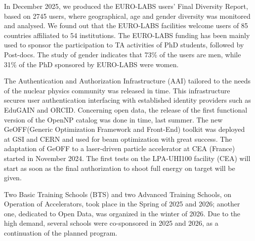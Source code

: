 In December 2025, we produced the EURO-LABS users' Final Diversity Report, based on 2745 users, where geographical, age and gender diversity was monitored and analysed. We found out that the EURO-LABS facilities welcome users of 85 countries affiliated to 54 institutions. The EURO-LABS funding has been mainly used to sponsor the participation to TA activities of PhD students, followed by Post-docs. The study of gender indicates that 73\% of the users are men, while 31\% of the PhD sponsored by EURO-LABS were women.

The Authentication and Authorization Infrastructure (AAI) tailored to the needs of the nuclear physics community was released in time.
This infrastructure secures user authentication interfacing with established identity providers such as EduGAIN and ORCID.
Concerning open data, the release of the first functional version of the OpenNP catalog was done in time, last summer.
The new GeOFF(Generic Optimization Framework
and Front-End) toolkit was deployed at GSI and CERN and used for beam optimization with great success. The adaptation of GeOFF to a laser-driven particle accelerator at CEA (France)  started in November 2024. The first tests on the LPA-UHI100 facility (CEA) will start as soon as the final authorization to shoot full energy on target will be given. 

Two Basic Training Schools (BTS) and two Advanced Training Schools, on Operation
of Accelerators, took place in the Spring of 2025 and 2026; another one, dedicated to Open Data, was organized in the winter of 2026.
Due to the high demand, several schools were co-sponsored in 2025 and 2026, as a continuation of the planned program. 



